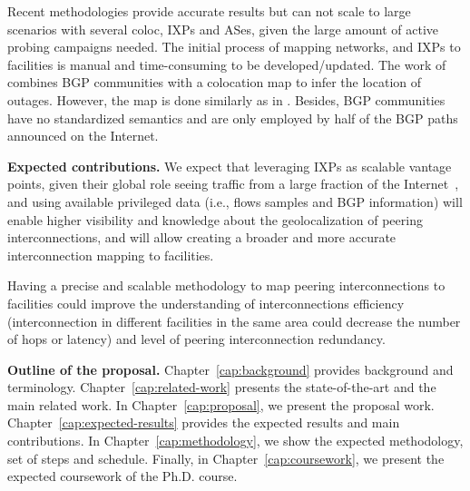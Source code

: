 	Recent methodologies \cite{Giotsas:2015:MPI:2716281.2836122} provide accurate results but can not scale to large scenarios with several coloc, IXPs and ASes, given the large amount of active probing campaigns needed. The initial process of mapping networks, and IXPs to facilities is manual and time-consuming to be developed/updated. The work of \cite{Giotsas:2017:DPI:3098822.3098855} combines BGP communities with a colocation map to infer the location of outages. However, the map is done similarly as in \cite{Giotsas:2015:MPI:2716281.2836122}. Besides, BGP communities have no standardized semantics and are only employed by half of the BGP paths announced on the Internet.


	\textbf{Expected contributions.} We expect that leveraging IXPs as scalable vantage points, given their global role seeing traffic from a large fraction of the Internet~\cite{Chatzis:2013:BUL:2504730.2504746}, and using available privileged data (i.e., flows samples and BGP information) will enable higher visibility and knowledge about the geolocalization of peering interconnections, and will allow creating a broader and more accurate interconnection mapping to facilities. 

	Having a precise and scalable methodology to map peering interconnections to facilities could improve the understanding of interconnections efficiency (interconnection in different facilities in the same area could decrease the number of hops or latency) and level of peering interconnection redundancy.


	\textbf{Outline of the proposal.} Chapter~\ref{cap:background} provides background and terminology. Chapter~\ref{cap:related-work} presents the state-of-the-art and the main related work. In Chapter~\ref{cap:proposal}, we present the proposal work. Chapter~\ref{cap:expected-results} provides the expected results and main contributions. In Chapter~\ref{cap:methodology}, we show the expected methodology, set of steps and schedule. Finally, in Chapter~\ref{cap:coursework}, we present the expected coursework of the Ph.D. course.


